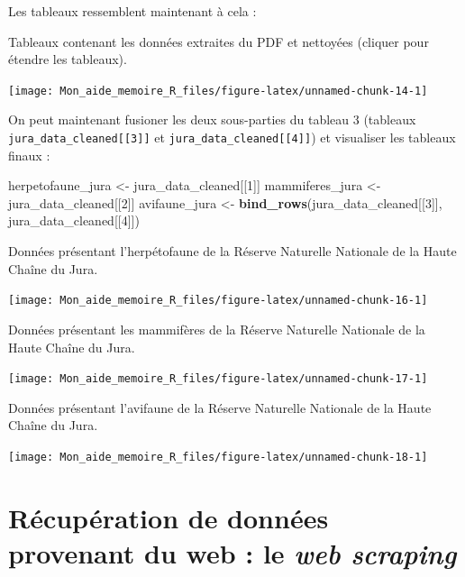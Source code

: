 \documentclass[
  french,
]{book}
\newenvironment{Shaded}{\begin{snugshade}}{\end{snugshade}}
\newcommand{\DecValTok}[1]{\textcolor[rgb]{0.00,0.00,0.81}{#1}}
\newcommand{\KeywordTok}[1]{\textcolor[rgb]{0.13,0.29,0.53}{\textbf{#1}}}
\newcommand{\NormalTok}[1]{#1}
\newcommand{\StringTok}[1]{\textcolor[rgb]{0.31,0.60,0.02}{#1}}
\begin{document}
Les tableaux ressemblent maintenant à cela :

\label{tab:juradatacleaned} Tableaux contenant les données extraites du PDF et nettoyées (cliquer pour étendre les tableaux).

\begin{center}\texttt{[image: Mon\_aide\_memoire\_R\_files/figure-latex/unnamed-chunk-14-1]} \end{center}

On peut maintenant fusioner les deux sous-parties du tableau 3 (tableaux
\texttt{jura\_data\_cleaned{[}{[}3{]}{]}} et \texttt{jura\_data\_cleaned{[}{[}4{]}{]}}) et visualiser les tableaux
finaux :

\begin{Shaded}
\begin{Highlighting}[]
\NormalTok{herpetofaune\_jura \textless{}{-}}\StringTok{ }\NormalTok{jura\_data\_cleaned[[}\DecValTok{1}\NormalTok{]]}
\NormalTok{mammiferes\_jura \textless{}{-}}\StringTok{ }\NormalTok{jura\_data\_cleaned[[}\DecValTok{2}\NormalTok{]]}
\NormalTok{avifaune\_jura \textless{}{-}}\StringTok{ }\KeywordTok{bind\_rows}\NormalTok{(jura\_data\_cleaned[[}\DecValTok{3}\NormalTok{]], jura\_data\_cleaned[[}\DecValTok{4}\NormalTok{]])}
\end{Highlighting}
\end{Shaded}

\label{tab:herpetofaune-jura}Données présentant l'herpétofaune de la Réserve Naturelle Nationale de la Haute Chaîne du Jura.

\begin{center}\texttt{[image: Mon\_aide\_memoire\_R\_files/figure-latex/unnamed-chunk-16-1]} \end{center}

\label{tab:mammifere-jura}Données présentant les mammifères de la Réserve Naturelle Nationale de la Haute Chaîne du Jura.

\begin{center}\texttt{[image: Mon\_aide\_memoire\_R\_files/figure-latex/unnamed-chunk-17-1]} \end{center}

\label{tab:avifaune-jura}Données présentant l'avifaune de la Réserve Naturelle Nationale de la Haute Chaîne du Jura.

\begin{center}\texttt{[image: Mon\_aide\_memoire\_R\_files/figure-latex/unnamed-chunk-18-1]} \end{center}

\hypertarget{ruxe9cupuxe9ration-de-donnuxe9es-provenant-du-web-le-web-scraping}{%
\section{\texorpdfstring{Récupération de données provenant du web : le \emph{web scraping}}{Récupération de données provenant du web : le web scraping}}\label{ruxe9cupuxe9ration-de-donnuxe9es-provenant-du-web-le-web-scraping}}
\end{document}
